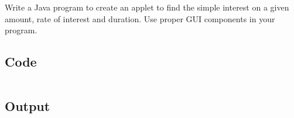 \documentclass[../main.tex]{subfiles}
\begin{document}
Write a Java program to create an applet to find the simple interest on a
given amount, rate of interest and duration. Use proper GUI components in your
program.

\subsection{Code}
\inputminted[frame=lines, breaklines, breakanywhere, numberblanklines=false]{java}{./programs/prog17/Interest.java}

\subsection{Output}
\end{document}
